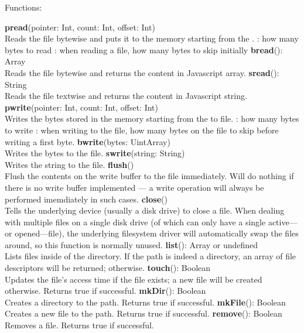 Functions:

\begin{outline}
\1\textbf{pread}(pointer: Int, count: Int, offset: Int)
\\Reads the file bytewise and puts it to the memory starting from the .
 \2: how many bytes to read
 \2: when reading a file, how many bytes to skip initially
\1\textbf{bread}(): Array
\\Reads the file bytewise and returns the content in Javascript array.
\1\textbf{sread}(): String
\\Reads the file textwise and returns the content in Javascript string.
\1\textbf{pwrite}(pointer: Int, count: Int, offset: Int)
\\Writes the bytes stored in the memory starting from the  to file.
 \2: how many bytes to write
 \2: when writing to the file, how many bytes on the file to skip before writing a first byte.
\1\textbf{bwrite}(bytes: UintArray)
\\Writes the bytes to the file.
\1\textbf{swrite}(string: String)
\\Writes the string to the file.
\1\textbf{flush}()
\\Flush the contents on the write buffer to the file immediately. Will do nothing if there is no write buffer implemented --- a write operation will always be performed imemdiately in such cases.
\1\textbf{close}()
\\Tells the underlying device (usually a disk drive) to close a file. When dealing with multiple files on a single disk drive (of which can only have a single active---or opened---file), the underlying filesystem driver will automatically swap the files around, so this function is normally unused.
\1\textbf{list}(): Array or undefined
\\Lists files inside of the directory. If the path is indeed a directory, an array of file descriptors will be returned;  otherwise.
\1\textbf{touch}(): Boolean
\\Updates the file's access time if the file exists; a new file will be created otherwise. Returns true if successful.
\1\textbf{mkDir}(): Boolean
\\Creates a directory to the path. Returns true if successful.
\1\textbf{mkFile}(): Boolean
\\Creates a new file to the path. Returns true if successful.
\1\textbf{remove}(): Boolean
\\Removes a file. Returns true if successful.
\end{outline}


